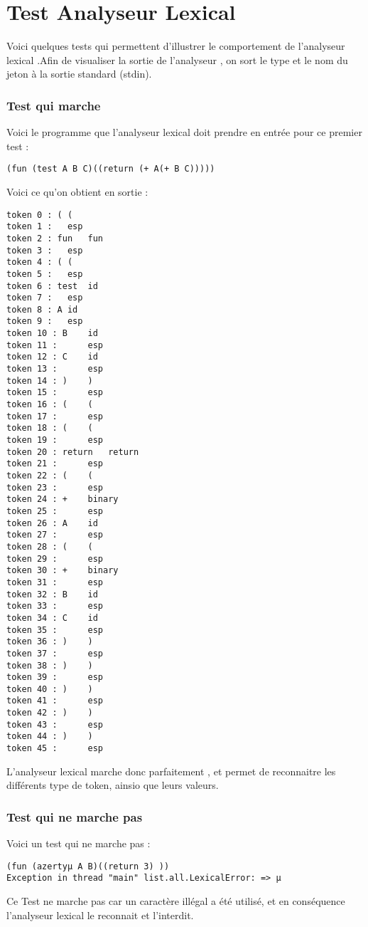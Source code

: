 \section{Test Analyseur Lexical}

Voici quelques tests qui permettent d'illustrer le comportement de l'analyseur lexical .Afin de visualiser la sortie de l'analyseur , on sort le type et le nom du jeton à la sortie standard (stdin).

\subsubsection{Test qui marche}
Voici le programme que l'analyseur lexical doit prendre en entrée pour ce premier test :
\begin{verbatim}
(fun (test A B C)((return (+ A(+ B C)))))
\end{verbatim}
Voici ce qu'on obtient en sortie :
\begin{verbatim}
token 0 : (	(
token 1 :  	esp
token 2 : fun	fun
token 3 :  	esp
token 4 : (	(
token 5 :  	esp
token 6 : test	id
token 7 :  	esp
token 8 : A	id
token 9 :  	esp
token 10 : B	id
token 11 :  	esp
token 12 : C	id
token 13 :  	esp
token 14 : )	)
token 15 :  	esp
token 16 : (	(
token 17 :  	esp
token 18 : (	(
token 19 :  	esp
token 20 : return	return
token 21 :  	esp
token 22 : (	(
token 23 :  	esp
token 24 : +	binary
token 25 :  	esp
token 26 : A	id
token 27 :  	esp
token 28 : (	(
token 29 :  	esp
token 30 : +	binary
token 31 :  	esp
token 32 : B	id
token 33 :  	esp
token 34 : C	id
token 35 :  	esp
token 36 : )	)
token 37 :  	esp
token 38 : )	)
token 39 :  	esp
token 40 : )	)
token 41 :  	esp
token 42 : )	)
token 43 :  	esp
token 44 : )	)
token 45 :  	esp
\end{verbatim}

L'analyseur lexical marche donc parfaitement , et permet de reconnaitre les différents type de token, ainsio que leurs valeurs.

\subsubsection{Test qui ne marche pas}

Voici un test qui ne marche pas :
\begin{verbatim}
(fun (azertyµ A B)((return 3) ))
Exception in thread "main" list.all.LexicalError: => µ
\end{verbatim}

Ce Test ne marche pas car un caractère illégal a été utilisé, et en conséquence l'analyseur lexical le reconnait et l'interdit.

